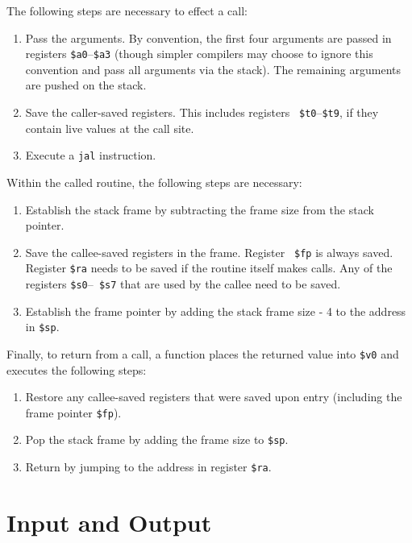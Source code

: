 \documentclass[11pt]{article}
\begin{document}
The following steps are necessary to effect a call:
\begin{enumerate}
  \item Pass the arguments.  By convention, the first four arguments
are passed in registers {\tt \$a0}--{\tt \$a3} (though simpler
compilers may choose to ignore this convention and pass all arguments
via the stack).  The remaining arguments are pushed on the stack.

  \item Save the caller-saved registers.  This includes registers {\tt
\$t0}--{\tt \$t9}, if they contain live values at the call site.

  \item Execute a {\tt jal} instruction.
\end{enumerate}

Within the called routine, the following steps are necessary:
\begin{enumerate}
  \item Establish the stack frame by subtracting the frame size from
the stack pointer.

  \item Save the callee-saved registers in the frame.  Register {\tt
\$fp} is always saved.  Register {\tt \$ra} needs to be saved if the
routine itself makes calls.  Any of the registers {\tt \$s0}--{\tt
\$s7} that are used by the callee need to be saved.

  \item Establish the frame pointer by adding the stack frame size - 4
to the address in {\tt \$sp}.
\end{enumerate}

Finally, to return from a call, a function places the returned value
into {\tt \$v0} and executes the following steps:
\begin{enumerate}
  \item Restore any callee-saved registers that were saved upon entry
(including the frame pointer {\tt \$fp}).

  \item Pop the stack frame by adding the frame size to {\tt \$sp}.

  \item Return by jumping to the address in register {\tt \$ra}.
\end{enumerate}

\section{Input and Output}
\label{sec:IO}
\end{document}
